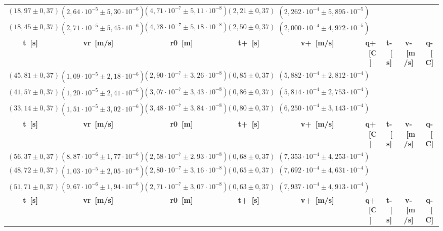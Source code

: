 \documentclass{article}
\begin{document}
\begin{table}[H]
\begin{flushleft}
\begin{tabular}{|c|c|c|c|c|c|c|c|c|}
        \((18,97 \pm 0,37)\) & \((2,64 \cdot 10^{-5} \pm 5,30 \cdot 10^{-6})\) & \((4,71 \cdot 10^{-7} \pm 5,11 \cdot 10^{-8})\) & \((2,21 \pm 0,37)\) & \((2,262 \cdot 10^{-4} \pm 5,895 \cdot 10^{-5})\) \\
        \((18,45 \pm 0,37)\) & \((2,71 \cdot 10^{-5} \pm 5,45 \cdot 10^{-6})\) & \((4,78 \cdot 10^{-7} \pm 5,18 \cdot 10^{-8})\) & \((2,50 \pm 0,37)\) & \((2,000 \cdot 10^{-4} \pm 4,972 \cdot 10^{-5})\) \\
        \toprule
        \textbf{t~[s]} & \textbf{vr~[m/s]} & \textbf{r0~[m]} & \textbf{t+~[s]} & \textbf{v+~[m/s]} & \textbf{q+~[C]} & \textbf{t-~[s]} & \textbf{v-~[m/s]} & \textbf{q-~[C]} \\
        \midrule
        \((45,81 \pm 0,37)\) & \((1,09 \cdot 10^{-5} \pm 2,18 \cdot 10^{-6})\) & \((2,90 \cdot 10^{-7} \pm 3,26 \cdot 10^{-8})\) & \((0,85 \pm 0,37)\) & \((5,882 \cdot 10^{-4} \pm 2,812 \cdot 10^{-4})\) \\
        \((41,57 \pm 0,37)\) & \((1,20 \cdot 10^{-5} \pm 2,41 \cdot 10^{-6})\) & \((3,07 \cdot 10^{-7} \pm 3,43 \cdot 10^{-8})\) & \((0,86 \pm 0,37)\) & \((5,814 \cdot 10^{-4} \pm 2,753 \cdot 10^{-4})\) \\
        \((33,14 \pm 0,37)\) & \((1,51 \cdot 10^{-5} \pm 3,02 \cdot 10^{-6})\) & \((3,48 \cdot 10^{-7} \pm 3,84 \cdot 10^{-8})\) & \((0,80 \pm 0,37)\) & \((6,250 \cdot 10^{-4} \pm 3,143 \cdot 10^{-4})\) \\
        \toprule
        \textbf{t~[s]} & \textbf{vr~[m/s]} & \textbf{r0~[m]} & \textbf{t+~[s]} & \textbf{v+~[m/s]} & \textbf{q+~[C]} & \textbf{t-~[s]} & \textbf{v-~[m/s]} & \textbf{q-~[C]} \\
        \midrule
        \((56,37 \pm 0,37)\) & \((8,87 \cdot 10^{-6} \pm 1,77 \cdot 10^{-6})\) & \((2,58 \cdot 10^{-7} \pm 2,93 \cdot 10^{-8})\) & \((0,68 \pm 0,37)\) & \((7,353 \cdot 10^{-4} \pm 4,253 \cdot 10^{-4})\) \\
        \((48,72 \pm 0,37)\) & \((1,03 \cdot 10^{-5} \pm 2,05 \cdot 10^{-6})\) & \((2,80 \cdot 10^{-7} \pm 3,16 \cdot 10^{-8})\) & \((0,65 \pm 0,37)\) & \((7,692 \cdot 10^{-4} \pm 4,631 \cdot 10^{-4})\) \\
        \((51,71 \pm 0,37)\) & \((9,67 \cdot 10^{-6} \pm 1,94 \cdot 10^{-6})\) & \((2,71 \cdot 10^{-7} \pm 3,07 \cdot 10^{-8})\) & \((0,63 \pm 0,37)\) & \((7,937 \cdot 10^{-4} \pm 4,913 \cdot 10^{-4})\) \\
        \toprule
        \textbf{t~[s]} & \textbf{vr~[m/s]} & \textbf{r0~[m]} & \textbf{t+~[s]} & \textbf{v+~[m/s]} & \textbf{q+~[C]} & \textbf{t-~[s]} & \textbf{v-~[m/s]} & \textbf{q-~[C]} \\

\end{tabular}
\end{flushleft}
\end{table}
\end{document}
